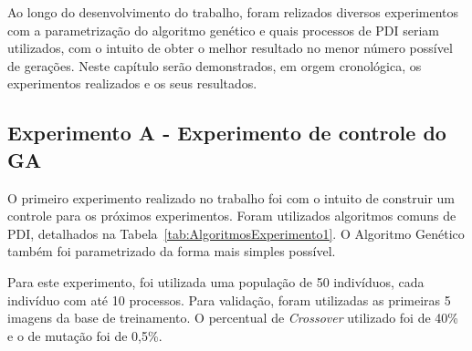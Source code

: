\documentclass[12pt,oneside,a4paper,english,french,spanish,brazil,]{abntex2}
\begin{document}
Ao longo do desenvolvimento do trabalho, foram relizados diversos experimentos com a parametrização do algoritmo genético e quais processos de PDI seriam utilizados, com o intuito de obter o melhor resultado no menor número possível de gerações. Neste capítulo serão demonstrados, em orgem cronológica, os experimentos realizados e os seus resultados.

\subsection{Experimento A - Experimento de controle do GA}

O primeiro experimento realizado no trabalho foi com o intuito de construir um controle para os próximos experimentos. Foram utilizados algoritmos comuns de PDI, detalhados na Tabela~\ref{tab:AlgoritmosExperimento1}. O Algoritmo Genético também foi parametrizado da forma mais simples possível. 

Para este experimento, foi utilizada uma população de 50 indivíduos, cada indivíduo com até 10 processos. Para validação, foram utilizadas as primeiras 5 imagens da base de treinamento. O percentual de \textit{Crossover} utilizado foi de 40\% e o de mutação foi de 0,5\%.
\end{document}
